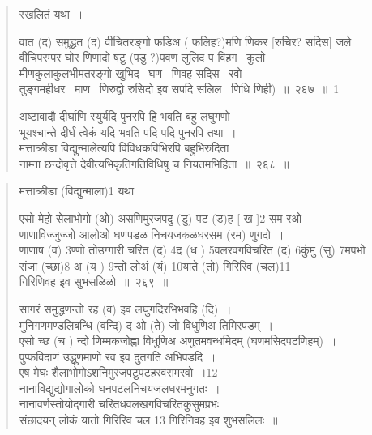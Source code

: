 \documentclass[11pt, openany]{book}
\begin{document}

\newpage

\begin{quote}
स्खलितं यथा~।

{\na *वात (द) समुद्धत (द) वीचितरङ्गो फडिअ ( फलिह?)मणि णिकर [रुचिर? सदिस] जले\\
 वीचिपरम्पर घोर णिणादो षटु (पडु ?)पवण लुलिद प विहग \textendash\ कुलो~।\\
मीणकुलाकुलभीमतरङ्गो खुभिद \textendash\ घण \textendash\ णिवह सदिस \textendash\ रवो \\
तुङ्गमहीधर \textendash\ माण \textendash\ णिरुद्वो रुसिदो इव सपदि सलिल \textendash\ णिधि णिही)~॥~२६७~॥~1}

{}

{\na अष्टावादौ दीर्घाणि स्युर्यदि पुनरपि हि भवति बहु लघुगणो \\
भूयश्चान्ते दीर्धं त्वेकं यदि भवति पदि पदि पुनरपि तथा~। \\
मत्ताक्रीडा विद्युन्मालेत्यपि विविधकविभिरपि बहुभिरुदिता\\
नाम्ना छन्दोवृत्ते देवीत्यभिकृतिगतिविधिषु च नियतमभिहिता~॥~२६८~॥}
\end{quote}


\newpage

\begin{quote}
मत्ताक्रीडा (विद्युन्माला)1 यथा \textendash\ 

{\na एसो मेहो सेलाभोगो (ओ) असणिमुरजपदु (डु) पट (ड)ह [ ख ]2 सम रओ \\
णाणाविज्जुज्जो आलोओ घणपडळ निचयजकळधरसम (रम) णुगदो~।\\
णाणाष (व) 3ण्णो तोउग्गारी चरित (द) 4द (ध ) 5वलरवगविचरित (द) 6कुंमु (सु) 7मपभो \\
संजा (च्छा)8 अ (य ) 9न्तो लोअं (यं) 10याते (तो) गिरिरिव (चल)11\\
गिरिणिवह इव सुभसळिळो~॥~२६९~॥}

{\qt सागरं समुद्धणन्तो रह (व) इव लघुगदिरभिभवहि (दि)~।\\
मुनिगणमण्डलिबन्धि (वन्दि) द ओ (ते) जो विधुणिअ तिमिरपडम्~।\\
एसो च्छ (च ) न्दो णिम्मकजोह्णा विधुणिअ अणुतमवन्धमिदम् (घणमसिदपटणिहम्)~। \\
पुप्फविदाणं उद्धुणमाणो रव इव दुतगति अभिपडदि~। \\
एष मेघः शैलाभोगोऽशनिमुरजपटुपटहरवसमरवो~।12 \\
नानाविद्युद्योगालोको घनपटलनिचयजलधरमनुगतः~।\\
नानावर्णस्तोयोद्गारी चरितधवलखगविचरितकुसुमप्रभः \\
संछादयन् लोकं यातो गिरिरिव चल 13 गिरिनिवह इव शुभसलिलः~॥ }
\end{quote}
\end{document}
